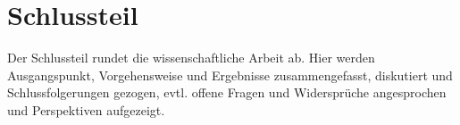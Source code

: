\chapter{Schlussteil}\label{Schluss}
Der Schlussteil rundet die wissenschaftliche Arbeit ab. Hier werden Ausgangspunkt, Vorgehensweise und Ergebnisse zusammengefasst, diskutiert und Schlussfolgerungen gezogen, evtl. offene Fragen und Widersprüche angesprochen und Perspektiven aufgezeigt.